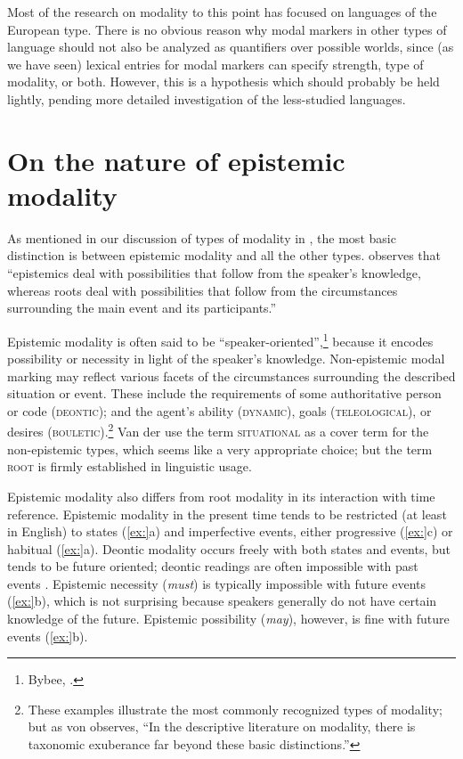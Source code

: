 Most of the research on modality to this point has focused on languages of the European type. There is no obvious reason why modal markers in other types of language should not also be analyzed as quantifiers over possible worlds, since (as we have seen) lexical entries for modal markers can specify strength, type of modality, or both. However, this is a hypothesis which should probably be held lightly, pending more detailed investigation of the less-studied languages.


\section{On the nature of epistemic modality}\label{sec:16.5}

As mentioned in our discussion of types of modality in , the most basic distinction is between epistemic modality and all the other types. \citet[1486]{Hacquard2011} observes that “epistemics deal with possibilities that follow from the speaker’s knowledge, whereas roots deal with possibilities that follow from the circumstances surrounding the main event and its participants.”



Epistemic modality is often said to be “speaker-oriented”,\footnote{Bybee, \citet{PerkinsPagliuca1994}.} because it encodes possibility or necessity in light of the speaker’s knowledge. Non-epistemic modal marking may reflect various facets of the circumstances surrounding the described situation or event. These include the requirements of some authoritative person or code (\textsc{deontic}); and the agent’s ability (\textsc{dynamic}), goals (\textsc{teleological}), or desires (\textsc{bouletic}).\footnote{These examples illustrate the most commonly recognized types of modality; but as von \citet{Fintel2006} observes, “In the descriptive literature on modality, there is taxonomic exuberance far beyond these basic distinctions.”} Van der \citet{AuweraAmmann2013} use the term \textsc{situational} as a cover term for the non-epistemic types, which seems like a very appropriate choice; but the term \textsc{root} is firmly established in linguistic usage.



Epistemic modality also differs from root modality in its interaction with time reference. Epistemic modality in the present time tends to be restricted (at least in English) to states (\ref{ex:}a) and imperfective events, either progressive (\ref{ex:}c) or habitual (\ref{ex:}a). Deontic modality occurs freely with both states and events, but tends to be future oriented; deontic readings are often impossible with past events . Epistemic necessity (\textit{must}) is typically impossible with future events (\ref{ex:}b), which is not surprising because speakers generally do not have certain knowledge of the future. Epistemic possibility (\textit{may}), however, is fine with future events (\ref{ex:}b). 


